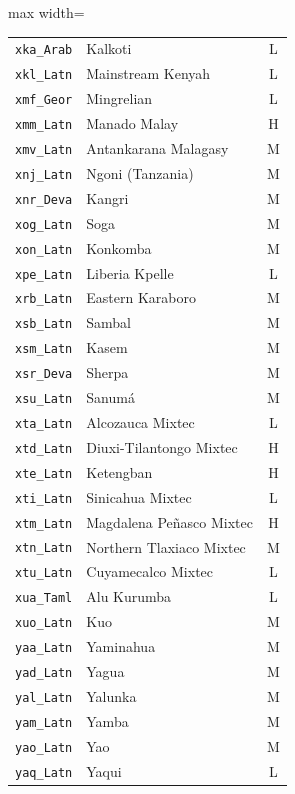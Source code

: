 {\begin{adjustbox}{max width=\textwidth}
\begin{tabular}{llc}
        \texttt{xka\_Arab} & Kalkoti & L \\
        \texttt{xkl\_Latn} & Mainstream Kenyah & L \\
        \texttt{xmf\_Geor} & Mingrelian & L \\
        \texttt{xmm\_Latn} & Manado Malay & H \\
        \texttt{xmv\_Latn} & Antankarana Malagasy & M \\
        \texttt{xnj\_Latn} & Ngoni (Tanzania) & M \\
        \texttt{xnr\_Deva} & Kangri & M \\
        \texttt{xog\_Latn} & Soga & M \\
        \texttt{xon\_Latn} & Konkomba & M \\
        \texttt{xpe\_Latn} & Liberia Kpelle & L \\
        \texttt{xrb\_Latn} & Eastern Karaboro & M \\
        \texttt{xsb\_Latn} & Sambal & M \\
        \texttt{xsm\_Latn} & Kasem & M \\
        \texttt{xsr\_Deva} & Sherpa & M \\
        \texttt{xsu\_Latn} & Sanumá & M \\
        \texttt{xta\_Latn} & Alcozauca Mixtec & L \\
        \texttt{xtd\_Latn} & Diuxi-Tilantongo Mixtec & H \\
        \texttt{xte\_Latn} & Ketengban & H \\
        \texttt{xti\_Latn} & Sinicahua Mixtec & L \\
        \texttt{xtm\_Latn} & Magdalena Peñasco Mixtec & H \\
        \texttt{xtn\_Latn} & Northern Tlaxiaco Mixtec & M \\
        \texttt{xtu\_Latn} & Cuyamecalco Mixtec & L \\
        \texttt{xua\_Taml} & Alu Kurumba & L \\
        \texttt{xuo\_Latn} & Kuo & M \\
        \texttt{yaa\_Latn} & Yaminahua & M \\
        \texttt{yad\_Latn} & Yagua & M \\
        \texttt{yal\_Latn} & Yalunka & M \\
        \texttt{yam\_Latn} & Yamba & M \\
        \texttt{yao\_Latn} & Yao & M \\
        \texttt{yaq\_Latn} & Yaqui & L \\

\end{tabular}
\end{adjustbox}}
